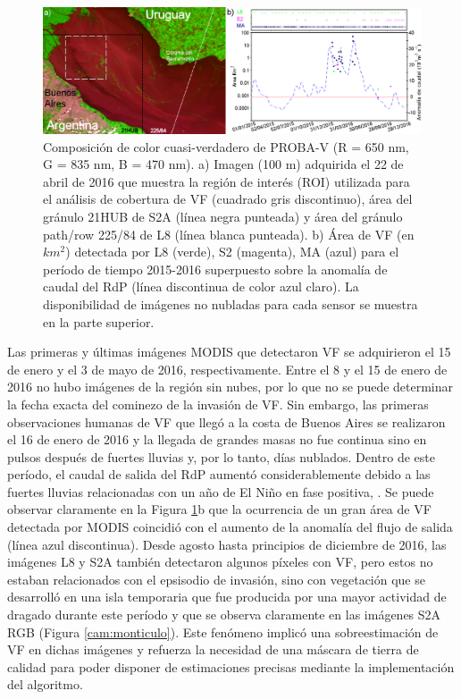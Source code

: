         \begin{figure}
        \centering
        \includegraphics[width=\textwidth]{cam/figures/area.png}
        \caption[Área de vegetación flotante detectada por OLI, MSI-A y Aqua/MODIS para el período de tiempo 2015-2016 y la anomalía de caudal del RdP.]{Composición de color cuasi-verdadero de PROBA-V (R = 650 nm, G = 835 nm, B = 470 nm). a) Imagen (100 m) adquirida el 22 de abril de 2016 que muestra la región de interés (ROI) utilizada para el análisis de cobertura de VF (cuadrado gris discontinuo), área del gránulo 21HUB de S2A (línea negra punteada) y área del gránulo path/row 225/84 de L8 (línea blanca punteada). b) Área de VF (en $km^{2}$) detectada por L8 (verde), S2 (magenta), MA (azul) para el período de tiempo 2015-2016 superpuesto sobre la anomalía de caudal del RdP (línea discontinua de color azul claro). La disponibilidad de imágenes no nubladas para cada sensor se muestra en la parte superior.}
        \label{cam:area}
        \end{figure}
        
        Las primeras y últimas imágenes MODIS que detectaron VF se adquirieron el 15 de enero y el 3 de mayo de 2016, respectivamente. Entre el 8 y el 15 de enero de 2016 no hubo imágenes de la región sin nubes, por lo que no se puede determinar la fecha exacta del cominezo de la invasión de VF. Sin embargo, las primeras observaciones humanas de VF que llegó a la costa de Buenos Aires se realizaron el 16 de enero de 2016 y la llegada de grandes masas no fue continua sino en pulsos después de fuertes lluvias y, por lo tanto, días nublados. Dentro de este período, el caudal de salida del RdP aumentó considerablemente debido a las fuertes lluvias relacionadas con un año de El Niño en fase positiva, \cite{ropewelski1987}\cite{mason2001}.
        Se puede observar claramente en la Figura \ref{cam:area}b que la ocurrencia de un gran área de VF detectada por MODIS coincidió con el aumento de la anomalía del flujo de salida (línea azul discontinua). Desde agosto hasta principios de diciembre de 2016, las imágenes L8 y S2A también detectaron algunos píxeles con VF, pero estos no estaban relacionados con el epsisodio de invasión, sino con vegetación que se desarrolló en una isla temporaria que fue producida por una mayor actividad de dragado durante este período y que se observa claramente en las imágenes S2A RGB (Figura \ref{cam:monticulo}). Este fenómeno implicó una sobreestimación de VF en dichas imágenes y refuerza la necesidad de una máscara de tierra de calidad para poder disponer de estimaciones precisas mediante la implementación del algoritmo.

